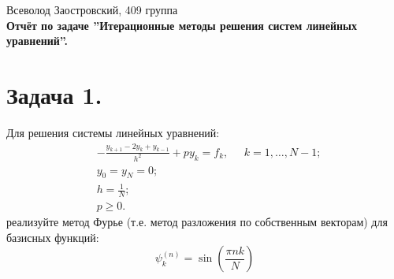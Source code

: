 \documentclass[14pt,a4paper]{extarticle}
\newcommand{\1}{\mathbbm{1}}
\begin{document}
\begin{center}

    {Всеволод Заостровский, 409 группа}\\
    {\bfseries Отчёт по задаче ''Итерационные методы решения систем линейных уравнений''.\\}
    \vspace{1cm}

\end{center}

\section{\textbf{Задача 1.}} Для решения системы линейных уравнений:
\begin{align*}
& -\frac{y_{k+1} - 2 y_k + y_{k-1}}{h^2} + p y_k = f_k, \;\;\;\;\; k = 1, \ldots, N - 1; \\
& y_0 = y_N = 0; \\
& h = \frac{1}{N}; \\
& p \geq 0.
\end{align*}
реализуйте метод Фурье (т.е. метод разложения по собственным векторам) для базисных функций:
\begin{equation}
    \psi_k^{(n)} = \sin(\frac{\pi n k}{N})
\end{equation}    
\end{document}
